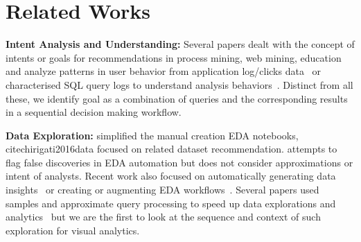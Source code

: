 \section{Related Works}
\noindent\textbf{Intent Analysis and Understanding: }
%
Several papers dealt with the concept of
intents or goals for recommendations in process mining, web mining, education~\cite{jiang2019time, jiang2019goal} and analyze patterns in user behavior from application log/clicks data~\cite{aggarwal2020goal, dev2017identifying} or characterised SQL query logs to understand analysis behaviors~\cite{jain2016sqlshare}. 
Distinct from all these, we identify goal as a combination of queries and the corresponding results in a sequential decision making workflow.

\noindent\textbf{Data Exploration:}
%
\cite{brachmann2019data} simplified
the manual creation EDA notebooks, cite{chirigati2016data} focused on related dataset recommendation. \cite{zhao2017controlling} attempts to flag false discoveries in EDA automation but does not consider approximations or intent of analysts.
%
Recent work also focused on automatically generating  data insights~\cite{ma2021metainsight, ding2019quickinsights} or creating or augmenting EDA workflows~\cite{atena2020sigmod, kery2018story, rule2018exploration}. 
Several papers used samples and approximate query processing to speed up data explorations and analytics~\cite{sheoran2022aaai, sheoran2022electra, babcock2003dynamic, chaudhuri2017approximate, ma2021learned, bater2020saqe} but we are the first to look at the sequence and context of such exploration for visual analytics. 

%

